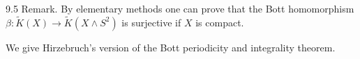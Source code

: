 9.5 Remark. By elementary methods one can prove that the Bott homomorphism $\beta: \tilde{K}(X) \rightarrow \tilde{K}(X \wedge S^2)$ is surjective if $X$ is compact.

We give Hirzebruch's version of the Bott periodicity and integrality theorem.
